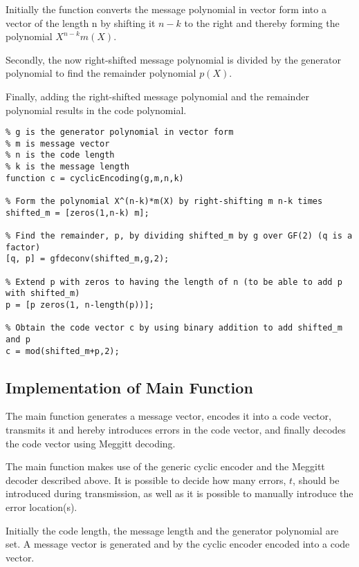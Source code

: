 \documentclass[Main]{subfiles}
\begin{document}
\noindent Initially the function converts the message polynomial in vector form into a vector of the length n by shifting it $n-k$ to the right and thereby forming the polynomial $X^{n-k}m(X)$. 

\noindent Secondly, the now right-shifted message polynomial is divided by the generator polynomial to find the remainder polynomial $p(X)$.

\noindent Finally, adding the right-shifted message polynomial and the remainder polynomial results in the code polynomial.  

\begin{lstlisting}[caption=Cyclic Encoder, style=Code-Matlab, label=lst:refID]
% cyclicEncoding is a function that encodes a message vector into systematic code given the following parameters
% g is the generator polynomial in vector form
% m is message vector
% n is the code length
% k is the message length
function c = cyclicEncoding(g,m,n,k)

% Form the polynomial X^(n-k)*m(X) by right-shifting m n-k times 
shifted_m = [zeros(1,n-k) m];

% Find the remainder, p, by dividing shifted_m by g over GF(2) (q is a factor)
[q, p] = gfdeconv(shifted_m,g,2);

% Extend p with zeros to having the length of n (to be able to add p with shifted_m)
p = [p zeros(1, n-length(p))];

% Obtain the code vector c by using binary addition to add shifted_m and p 
c = mod(shifted_m+p,2);
\end{lstlisting}

\subsection{Implementation of Main Function}
The main function generates a message vector, encodes it into a code vector, transmits it and hereby introduces errors in the code vector, and finally decodes the code vector using Meggitt decoding.

\noindent The main function makes use of the generic cyclic encoder and the Meggitt decoder described above. It is possible to decide how many errors, $t$, should be introduced during transmission, as well as it is possible to manually introduce the error location(s).

\noindent Initially the code length, the message length and the generator polynomial are set. A message vector is generated and by the cyclic encoder encoded into a code vector. 
\end{document}
